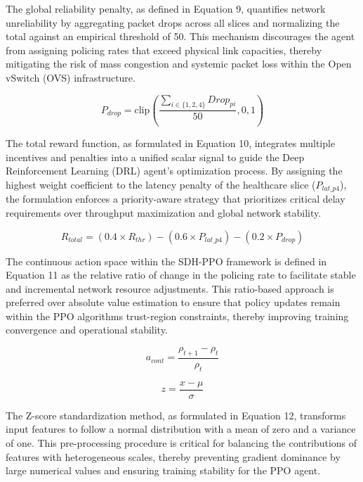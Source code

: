The global reliability penalty, as defined in Equation 9, quantifies network unreliability by aggregating packet drops across all slices and normalizing the total against an empirical threshold of 50. This mechanism discourages the agent from assigning policing rates that exceed physical link capacities, thereby mitigating the risk of mass congestion and systemic packet loss within the Open vSwitch (OVS) infrastructure.

\begin{equation}\label{eq:9}
P_{drop} = \text{clip}\left( \frac{\sum_{i \in \text{\{}1,2,4\text{\}}}^{}{Drop_{pi}}}{50},0,1 \right)
\end{equation}

The total reward function, as formulated in Equation 10, integrates multiple incentives and penalties into a unified scalar signal to guide the Deep Reinforcement Learning (DRL) agent's optimization process. By assigning the highest weight coefficient to the latency penalty of the healthcare slice (\(P_{lat\text{\_}p4}\)), the formulation enforces a priority-aware strategy that prioritizes critical delay requirements over throughput maximization and global network stability.

\begin{equation}\label{eq:10}
R_{total} = \left( 0.4 \times R_{thr} \right) - \left( 0.6 \times P_{lat\text{\_}p4} \right) - \left( 0.2 \times P_{drop} \right)
\end{equation}

The continuous action space within the SDH-PPO framework is defined in Equation 11 as the relative ratio of change in the policing rate to facilitate stable and incremental network resource adjustments. This ratio-based approach is preferred over absolute value estimation to ensure that policy updates remain within the PPO algorithm\textquotesingle s trust-region constraints, thereby improving training convergence and operational stability.

\begin{equation}\label{eq:11}
a_{cont} = \frac{\rho_{t + 1} - \rho_{t}}{\rho_{t}}
\end{equation}

\begin{equation}\label{eq:12}
z = \frac{x - \mu}{\sigma}
\end{equation}

The Z-score standardization method, as formulated in Equation 12, transforms input features to follow a normal distribution with a mean of zero and a variance of one. This pre-processing procedure is critical for balancing the contributions of features with heterogeneous scales, thereby preventing gradient dominance by large numerical values and ensuring training stability for the PPO agent.

